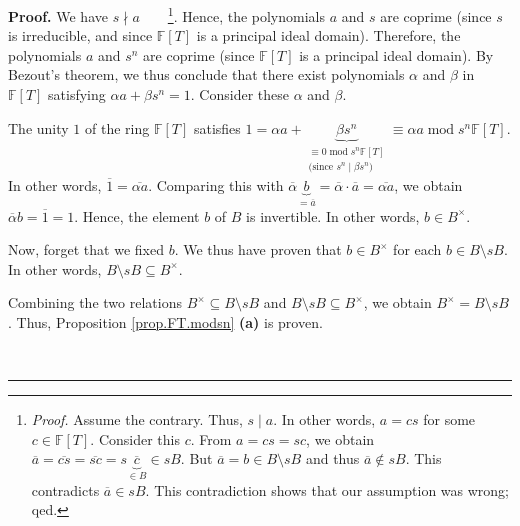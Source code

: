\documentclass[numbers=enddot,12pt,final,onecolumn,notitlepage]{scrartcl}%
\theoremstyle{definition}
\newenvironment{proof}[1][Proof]{\noindent\textbf{#1.} }{\ \rule{0.5em}{0.5em}}
\begin{document}
\begin{proof}
We have $s\nmid a$\ \ \ \ \footnote{\textit{Proof.} Assume the contrary. Thus,
$s\mid a$. In other words, $a=cs$ for some $c\in\mathbb{F}\left[  T\right]  $.
Consider this $c$. From $a=cs=sc$, we obtain $\overline{a}=\overline
{cs}=\overline{sc}=s\underbrace{\overline{c}}_{\in B}\in sB$. But
$\overline{a}=b\in B\setminus sB$ and thus $\overline{a}\notin sB$. This
contradicts $\overline{a}\in sB$. This contradiction shows that our assumption
was wrong; qed.}. Hence, the polynomials $a$ and $s$ are coprime (since $s$ is
irreducible, and since $\mathbb{F}\left[  T\right]  $ is a principal ideal
domain). Therefore, the polynomials $a$ and $s^{n}$ are coprime (since
$\mathbb{F}\left[  T\right]  $ is a principal ideal domain). By Bezout's
theorem, we thus conclude that there exist polynomials $\alpha$ and $\beta$ in
$\mathbb{F}\left[  T\right]  $ satisfying $\alpha a+\beta s^{n}=1$. Consider
these $\alpha$ and $\beta$.

The unity $1$ of the ring $\mathbb{F}\left[  T\right]  $ satisfies $1=\alpha
a+\underbrace{\beta s^{n}}_{\substack{\equiv0\operatorname{mod}s^{n}%
\mathbb{F}\left[  T\right]  \\\text{(since }s^{n}\mid\beta s^{n}\text{)}%
}}\equiv\alpha a\operatorname{mod}s^{n}\mathbb{F}\left[  T\right]  $. In other
words, $\overline{1}=\overline{\alpha a}$. Comparing this with $\overline
{\alpha}\underbrace{b}_{=\overline{a}}=\overline{\alpha}\cdot\overline
{a}=\overline{\alpha a}$, we obtain $\overline{\alpha}b=\overline{1}=1$.
Hence, the element $b$ of $B$ is invertible. In other words, $b\in B^{\times}$.

Now, forget that we fixed $b$. We thus have proven that $b\in B^{\times}$ for
each $b\in B\setminus sB$. In other words, $B\setminus sB\subseteq B^{\times}$.

Combining the two relations $B^{\times}\subseteq B\setminus sB$ and
$B\setminus sB\subseteq B^{\times}$, we obtain $B^{\times}=B\setminus sB$.
Thus, Proposition \ref{prop.FT.modsn} \textbf{(a)} is proven. \medskip


\end{proof}
\end{document}
